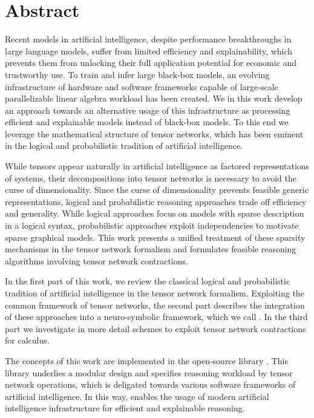 \chapter{Abstract}

Recent models in artificial intelligence, despite performance breakthroughs in large language models, suffer from limited efficiency and explainability, which prevents them from unlocking their full application potential for economic and trustworthy use.
To train and infer large black-box models, an evolving infrastructure of hardware and software frameworks capable of large-scale parallelizable linear algebra workload has been created.
We in this work develop an approach towards an alternative usage of this infrastructure as processing efficient and explainable models instead of black-box models.
To this end we leverage the mathematical structure of tensor networks, which has been eminent in the logical and probabilistic tradition of artificial intelligence.

While tensors appear naturally in artificial intelligence as factored representations of systems, their decompositions into tensor networks is necessary to avoid the curse of dimensionality. %
Since the curse of dimensionality prevents feasible generic representations, logical and probabilistic reasoning approaches trade off efficiency and generality.
While logical approaches focus on models with sparse description in a logical syntax, probabilistic approaches exploit independencies to motivate sparse graphical models.
This work presents a unified treatment of these sparsity mechanisms in the tensor network formalism and formulates feasible reasoning algorithms involving tensor network contractions.

In the first part of this work, we review the classical logical and probabilistic tradition of artificial intelligence in the tensor network formalism.
Exploiting the common framework of tensor networks, the second part describes the integration of these approaches into a neuro-symbolic framework, which we call \HybridLogicNetworks{}.
In the third part we investigate in more detail schemes to exploit tensor network contractions for calculus.

The concepts of this work are implemented in the open-source \python library \tnreason.
This library underlies a modular design and specifies reasoning workload by tensor network operations, which is deligated towards various software frameworks of artificial intelligence.
In this way, \tnreason enables the usage of modern artificial intelligence infrastructure for efficient and explainable reasoning.